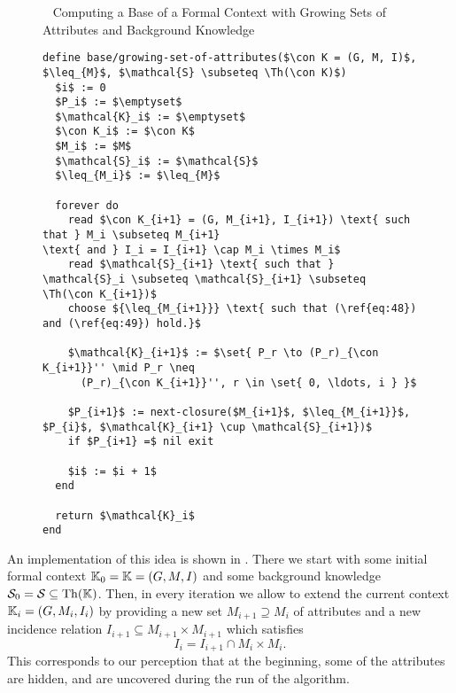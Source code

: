 
\begin{figure}[tp]
  \begin{Algorithm}~ Computing a Base of a Formal
    Context with Growing Sets of Attributes and Background Knowledge%
    \label{alg:base/growing-set-of-attributes}
\begin{lstlisting}
define base/growing-set-of-attributes($\con K = (G, M, I)$, $\leq_{M}$, $\mathcal{S} \subseteq \Th(\con K)$)
  $i$ := 0
  $P_i$ := $\emptyset$
  $\mathcal{K}_i$ := $\emptyset$
  $\con K_i$ := $\con K$
  $M_i$ := $M$
  $\mathcal{S}_i$ := $\mathcal{S}$
  $\leq_{M_i}$ := $\leq_{M}$

  forever do
    read $\con K_{i+1} = (G, M_{i+1}, I_{i+1}) \text{ such that } M_i \subseteq M_{i+1}
\text{ and } I_i = I_{i+1} \cap M_i \times M_i$
    read $\mathcal{S}_{i+1} \text{ such that } \mathcal{S}_i \subseteq \mathcal{S}_{i+1} \subseteq \Th(\con K_{i+1})$
    choose ${\leq_{M_{i+1}}} \text{ such that (\ref{eq:48}) and (\ref{eq:49}) hold.}$

    $\mathcal{K}_{i+1}$ := $\set{ P_r \to (P_r)_{\con K_{i+1}}'' \mid P_r \neq
      (P_r)_{\con K_{i+1}}'', r \in \set{ 0, \ldots, i } }$

    $P_{i+1}$ := next-closure($M_{i+1}$, $\leq_{M_{i+1}}$, $P_{i}$, $\mathcal{K}_{i+1} \cup \mathcal{S}_{i+1})$
    if $P_{i+1} =$ nil exit

    $i$ := $i + 1$  
  end

  return $\mathcal{K}_i$  
end    
\end{lstlisting}  
  \end{Algorithm}
\end{figure}

An implementation of this idea is shown in .
There we start with some initial formal context ${\mathbb{K}}_{0} = {\mathbb{K}} = (G, M, I)$ and some
background knowledge $\mathcal{S}_{0} = \mathcal{S} \subseteq \operatorname{Th}({\mathbb{K}})$.  Then, in
every iteration we allow to extend the current context ${\mathbb{K}}_{i} = (G, M_{i}, I_{i})$ by
providing a new set $M_{i+1} \supseteq M_{i}$ of attributes and a new incidence relation
$I_{i+1} \subseteq M_{i+1} \times M_{i+1}$ which satisfies
\begin{equation*}
  I_{i} = I_{i+1} \cap M_{i} \times M_{i}.
\end{equation*}
This corresponds to our perception that at the beginning, some of the attributes are
hidden, and are uncovered during the run of the algorithm.

